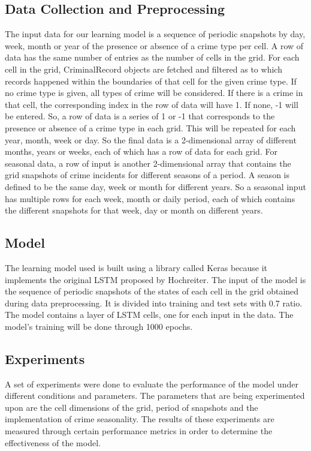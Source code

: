 \subsection{Data Collection and Preprocessing}
    The input data for our learning model is a sequence of periodic snapshots by day, week, month or year of the presence or absence of a crime type per cell. A row of data has the same number of entries as the number of cells in the grid. For each cell in the grid, CriminalRecord objects are fetched and filtered as to which records happened within the boundaries of that cell for the given crime type. If no crime type is given, all types of crime will be considered. If there is a crime in that cell, the corresponding index in the row of data will have 1. If none, -1 will be entered. So, a row of data is a series of 1 or -1 that corresponds to the presence or absence of a crime type in each grid. This will be repeated for each year, month, week or day. So the final data is a 2-dimensional array of different months, years or weeks, each of which has a row of data for each grid.
    For seasonal data, a row of input is another 2-dimensional array that contains the grid snapshots of crime incidents for different seasons of a period. A season is defined to be the same day, week or month for different years. So a seasonal input has multiple rows for each week, month or daily period, each of which contains the different snapshots for that week, day or month on different years.

\subsection{Model}
    The learning model used is built using a library called Keras because it implements the original LSTM proposed by Hochreiter. The input of the model is the sequence of periodic snapshots of the states of each cell in the grid obtained during data preprocessing. It is divided into training and test sets with 0.7 ratio. The model contains a layer of LSTM cells, one for each input in the data. The model's training will be done through 1000 epochs.

\subsection{Experiments}
    A set of experiments were done to evaluate the performance of the model under different conditions and parameters. The parameters that are being experimented upon are the cell dimensions of the grid, period of snapshots and the implementation of crime seasonality. The results of these experiments are measured through certain performance metrics in order to determine the effectiveness of the model.


